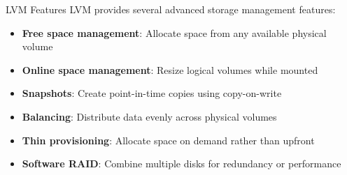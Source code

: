 \begin{concept}{LVM Features}
    LVM provides several advanced storage management features:
    \begin{itemize}
        \item \textbf{Free space management}: Allocate space from any available physical volume
        \item \textbf{Online space management}: Resize logical volumes while mounted
        \item \textbf{Snapshots}: Create point-in-time copies using copy-on-write
        \item \textbf{Balancing}: Distribute data evenly across physical volumes
        \item \textbf{Thin provisioning}: Allocate space on demand rather than upfront
        \item \textbf{Software RAID}: Combine multiple disks for redundancy or performance
    \end{itemize}
\end{concept}


